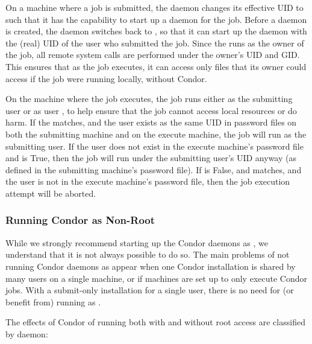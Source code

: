 On a machine where a job is submitted,
the  daemon
changes its effective UID to 
such that it has the capability to start up a  daemon
for the job.
Before a  daemon is created,
the  daemon
switches back to ,
so that it can start up the  daemon with the (real) UID
of the user who submitted the job.
Since the  runs as the owner of the job,
all remote system calls are performed under the owner's UID
and GID.
This ensures that as the job executes,
it can access only files that its owner could access if the job
were running locally, without Condor.

On the machine where the job executes, the 
job runs either as the submitting user or as user ,
to help ensure that the job cannot access local resources or do harm.  
If the  matches,
and the user exists as the same UID in password files
on both the submitting machine and on the execute machine,
the job will run as the submitting user.
If the user does not exist in the execute machine's
password file and  is True,
then the job will run under the submitting user's UID anyway (as
defined in the submitting machine's password file).
If  is False,
and  matches,
and the user is not in the execute machine's password file,
then the job execution attempt will be aborted.

\subsubsection{\label{sec:Non-Root}Running Condor as Non-Root}

While we strongly recommend starting up the Condor daemons as ,
we understand that it is not always possible to do so.
The main problems of not running Condor daemons as 
appear when one Condor installation is shared by many users on a
single machine, or if machines are set up to only execute
Condor jobs.  With a submit-only installation for a
single user, there is no need for (or benefit from) running as
.

The effects of Condor of running both with and without root access
are classified by daemon:

